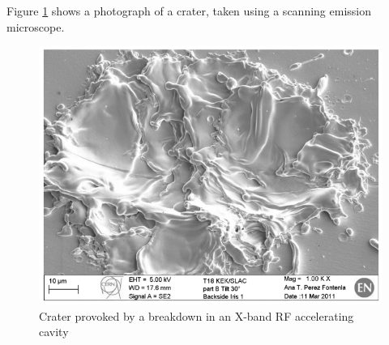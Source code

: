 Figure \ref{SEM_crater} shows a photograph of a crater, taken using a scanning emission microscope.
\begin{figure}[h]
\centering
\includegraphics[scale=0.4]{pictures/crater}
\caption{Crater provoked by a breakdown in an X-band RF accelerating cavity \cite{Wuensch:advaces}}
\label{SEM_crater}
\end{figure}



